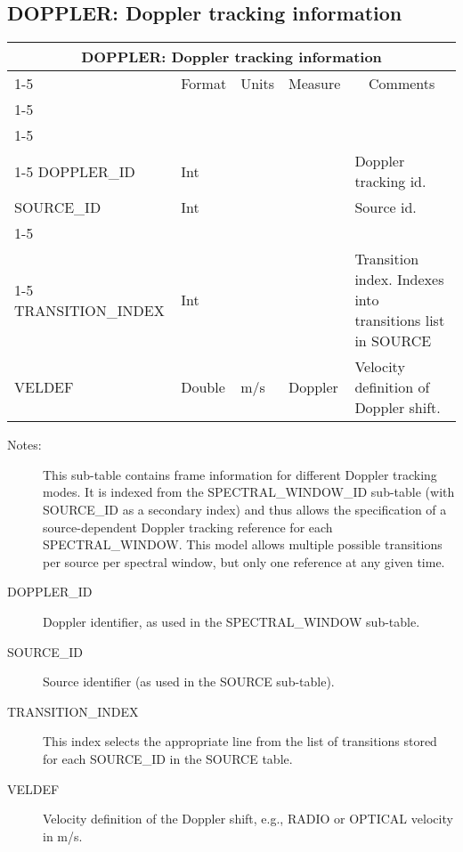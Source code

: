 \documentclass{article}
\newcommand{\defline}[1]{\cline{1-5}
\multicolumn{5}{|l|}{#1} \\
\cline{1-5}}
\newcommand{\definetable}[2]
{
	\vfill\newpage
	\subsection{#1}
        \vspace{0.15in}
        \small
	\begin{tabular}{|l|p{1.25in}|l|p{.9in}|p{1.4in}|}
	\hline
	\multicolumn{5}{|c|}{\bf #1}\\ 
	\cline{1-5}
        \multicolumn{1}{|c|}{Name}&\multicolumn{1}{|c|}{Format}&
        \multicolumn{1}{|c|}{Units}&\multicolumn{1}{|c|}{Measure}&
        \multicolumn{1}{|c|}{Comments}\\
        \cline{1-5}
        #2
        \hline
	\end{tabular}
}
\begin{document}
\definetable{DOPPLER: Doppler tracking information}{
\defline{\bf Columns}
\defline{\em Key}
DOPPLER\_ID  & Int & & & Doppler tracking id.\\
SOURCE\_ID  & Int & & & Source id.\\
\defline{\em Data}
TRANSITION\_INDEX & Int & & & Transition index. Indexes into transitions list in SOURCE\\
VELDEF & Double & m/s & Doppler & Velocity definition of Doppler shift.\\
}
\begin{description}

\item[Notes:] This sub-table contains frame information 
for different Doppler tracking modes. It is indexed from the
SPECTRAL\_WINDOW\_ID sub-table (with SOURCE\_ID as a secondary index)
and thus allows the specification of a source-dependent Doppler
tracking reference for each SPECTRAL\_WINDOW. This model allows
multiple possible transitions per source per spectral window, but only
one reference at any given time.

\item[DOPPLER\_ID] Doppler identifier, as used in the SPECTRAL\_WINDOW
sub-table.

\item[SOURCE\_ID] Source identifier (as used in the SOURCE sub-table).

\item[TRANSITION\_INDEX] This index selects the appropriate line from the
list of transitions stored for each SOURCE\_ID in the SOURCE table.

\item[VELDEF] Velocity definition of the Doppler shift, e.g., RADIO or
OPTICAL velocity in m/s.

\end{description}
\end{document}
